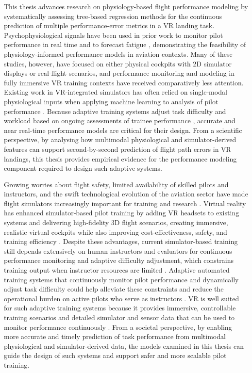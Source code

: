 \documentclass[11pt, a4paper]{article}
\begin{document}
This thesis advances research on physiology-based flight performance modeling by systematically assessing tree‑based regression methods for the continuous prediction of multiple performance-error metrics in a VR landing task. Psychophysiological signals have been used in prior work to monitor pilot performance in real time and to forecast fatigue \cite{alreshidi-2024,dideriksen-2019,wilson-2019}, demonstrating the feasibility of physiology‑informed performance models in aviation contexts. Many of these studies, however, have focused on either physical cockpits with $2$D simulator displays or real‑flight scenarios, and performance monitoring and modeling in fully immersive VR training contexts have received comparatively less attention. Existing work in VR‑integrated simulators has often relied on single‑modal physiological inputs when applying machine learning to analysis of pilot performance \cite{moore-2023,rajendran-2021}. Because adaptive training systems adjust task difficulty and workload based on ongoing assessments of trainee performance \cite{fraulini-2024}, accurate and near real-time performance models are critical for their design. From a scientific perspective, by analysing how multimodal physiological and simulator-derived features can support second-by-second prediction of flight path errors in VR landings, this thesis provides empirical evidence for the performance modeling component required to design such adaptive systems.

Growing worries about flight safety, limited availability of skilled pilots and instructors, and the swift technological evolution of the aviation sector have made flight simulators increasingly important for training and research \cite{wang-2024}. Virtual reality has enhanced simulator‑based pilot training by adding VR headsets to existing systems and delivering high‑fidelity $3$D flight scenarios, creating immersive, realistic virtual cockpits while also improving cost‑effectiveness, safety, and training efficiency \cite{wang-2024}. Despite these advantages, current simulator-based training still depends extensively on human instructors and evaluators for continuous performance monitoring and adaptive difficulty adjustment, which constrains training output when instructor resources are limited \cite{caballero-2023}. Adaptive automated training systems that continuously monitor pilot performance and dynamically adjust task difficulty could help alleviate these constraints and reduce the operational burden on active pilots who serve as instructors \cite{barry-2025}. VR is well suited for such adaptive training systems because it provides immersive, controllable training scenarios and detailed simulator and sensor data that can be used to monitor performance continuously \cite{reyes-2022}. From a societal perspective, by enabling more accurate and timely prediction of task performance from multimodal physiological and simulator-derived data, the models examined in this thesis can guide the design of such systems and support safer and more scalable pilot training.
\end{document}
